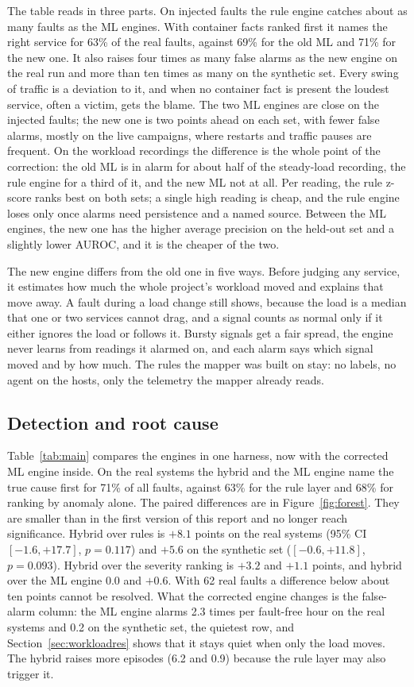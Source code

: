 The table reads in three parts. On injected faults the rule engine catches about as many faults as the ML engines. With container facts ranked first it names the right service for 63\% of the real faults, against 69\% for the old ML and 71\% for the new one. It also raises four times as many false alarms as the new engine on the real run and more than ten times as many on the synthetic set. Every swing of traffic is a deviation to it, and when no container fact is present the loudest service, often a victim, gets the blame. The two ML engines are close on the injected faults; the new one is two points ahead on each set, with fewer false alarms, mostly on the live campaigns, where restarts and traffic pauses are frequent. On the workload recordings the difference is the whole point of the correction: the old ML is in alarm for about half of the steady-load recording, the rule engine for a third of it, and the new ML not at all. Per reading, the rule z-score ranks best on both sets; a single high reading is cheap, and the rule engine loses only once alarms need persistence and a named source. Between the ML engines, the new one has the higher average precision on the held-out set and a slightly lower AUROC, and it is the cheaper of the two.

The new engine differs from the old one in five ways. Before judging any service, it estimates how much the whole project's workload moved and explains that move away. A fault during a load change still shows, because the load is a median that one or two services cannot drag, and a signal counts as normal only if it either ignores the load or follows it. Bursty signals get a fair spread, the engine never learns from readings it alarmed on, and each alarm says which signal moved and by how much. The rules the mapper was built on stay: no labels, no agent on the hosts, only the telemetry the mapper already reads.

\subsection{Detection and root cause}
Table~\ref{tab:main} compares the engines in one harness, now with the corrected ML engine inside. On the real systems the hybrid and the ML engine name the true cause first for 71\% of all faults, against 63\% for the rule layer and 68\% for ranking by anomaly alone. The paired differences are in Figure~\ref{fig:forest}. They are smaller than in the first version of this report and no longer reach significance. Hybrid over rules is $+8.1$ points on the real systems (95\% CI $[-1.6, +17.7]$, $p = 0.117$) and $+5.6$ on the synthetic set ($[-0.6, +11.8]$, $p = 0.093$). Hybrid over the severity ranking is $+3.2$ and $+1.1$ points, and hybrid over the ML engine $0.0$ and $+0.6$. With 62 real faults a difference below about ten points cannot be resolved. What the corrected engine changes is the false-alarm column: the ML engine alarms 2.3 times per fault-free hour on the real systems and 0.2 on the synthetic set, the quietest row, and Section~\ref{sec:workloadres} shows that it stays quiet when only the load moves. The hybrid raises more episodes (6.2 and 0.9) because the rule layer may also trigger it.

